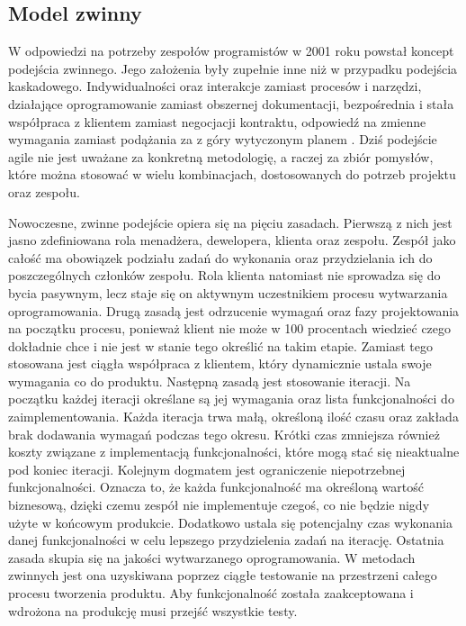\subsection{Model zwinny}
\label{subsec:modelZwinny}
W odpowiedzi na potrzeby zespołów programistów w 2001 roku powstał koncept
podejścia zwinnego. Jego założenia były zupełnie inne niż w przypadku podejścia
kaskadowego. Indywidualności oraz interakcje zamiast procesów i narzędzi, działające
oprogramowanie zamiast obszernej dokumentacji, bezpośrednia i stała współpraca z klientem
zamiast negocjacji kontraktu, odpowiedź na zmienne wymagania zamiast podążania za z góry
wytyczonym planem \cite{MAN01}. Dziś podejście agile nie jest uważane za konkretną metodologię,
a raczej za zbiór pomysłów, które można stosować w wielu kombinacjach, dostosowanych do
potrzeb projektu oraz zespołu.


Nowoczesne, zwinne podejście opiera się na pięciu zasadach\cite{AGI01}. Pierwszą z nich jest
jasno zdefiniowana rola menadżera, dewelopera, klienta oraz zespołu. Zespół jako całość ma
obowiązek podziału zadań do wykonania oraz przydzielania ich do poszczególnych członków zespołu. Rola
klienta natomiast nie sprowadza się do bycia pasywnym, lecz staje się on aktywnym
uczestnikiem procesu wytwarzania oprogramowania. Drugą zasadą jest odrzucenie wymagań
oraz fazy projektowania na początku procesu, ponieważ klient nie może w 100 procentach wiedzieć czego dokładnie chce i
nie jest w stanie tego określić na takim etapie. Zamiast tego stosowana jest ciągła współpraca
z klientem, który dynamicznie ustala swoje wymagania co do produktu. Następną zasadą jest
stosowanie iteracji. Na początku każdej iteracji określane są jej wymagania oraz lista
funkcjonalności do zaimplementowania. Każda iteracja trwa małą, określoną ilość czasu oraz
zakłada brak dodawania wymagań podczas tego okresu. Krótki czas zmniejsza również
koszty związane z implementacją funkcjonalności, które mogą stać się nieaktualne pod koniec
iteracji. Kolejnym dogmatem jest ograniczenie niepotrzebnej funkcjonalności. Oznacza to, że
każda funkcjonalność ma określoną wartość biznesową, dzięki czemu zespół nie
implementuje czegoś, co nie będzie nigdy użyte w końcowym produkcie. Dodatkowo ustala
się potencjalny czas wykonania danej funkcjonalności w celu lepszego przydzielenia zadań na
iterację. Ostatnia zasada skupia się na jakości wytwarzanego oprogramowania. W metodach
zwinnych jest ona uzyskiwana poprzez ciągłe testowanie na przestrzeni całego procesu
tworzenia produktu. Aby funkcjonalność została zaakceptowana i wdrożona na produkcję
musi przejść wszystkie testy.

